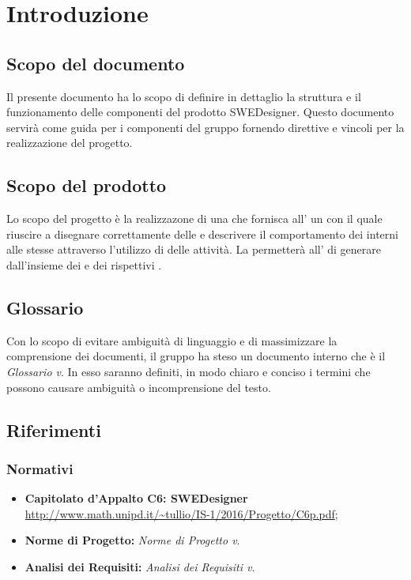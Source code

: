 \section{Introduzione}

\subsection{Scopo del documento}
Il presente documento ha lo scopo di definire in dettaglio la struttura e il funzionamento delle componenti del prodotto SWEDesigner. Questo documento servirà come guida per i componenti del gruppo fornendo direttive e vincoli per la realizzazione del progetto.

\subsection{Scopo del prodotto}
Lo scopo del progetto è la realizzazone di una  che fornisca all' un   con il quale riuscire a disegnare correttamente  delle 
          e descrivere il comportamento dei  interni alle stesse attraverso l'utilizzo di  delle attività.
          La  permetterà all' di generare   dall'insieme dei  e dei rispettivi .
\subsection{Glossario}
Con lo scopo di evitare ambiguità di linguaggio e di massimizzare la comprensione dei documenti, il gruppo ha steso un documento interno che è il \emph{Glossario v}\VersioneG{}. In esso saranno definiti, in modo chiaro e conciso i termini che possono causare ambiguità o incomprensione del testo.

\subsection{Riferimenti}
\subsubsection{Normativi}
\begin{itemize}
	\item \textbf{Capitolato d'Appalto C6: SWEDesigner} \\
		\url{http://www.math.unipd.it/~tullio/IS-1/2016/Progetto/C6p.pdf}; \\
	\item \textbf{Norme di Progetto:} \textit{Norme di Progetto v\VersioneNP}. \\

		\item \textbf{Analisi dei Requisiti:} \textit{Analisi dei Requisiti v\VersioneAR}. \\
\end{itemize}
